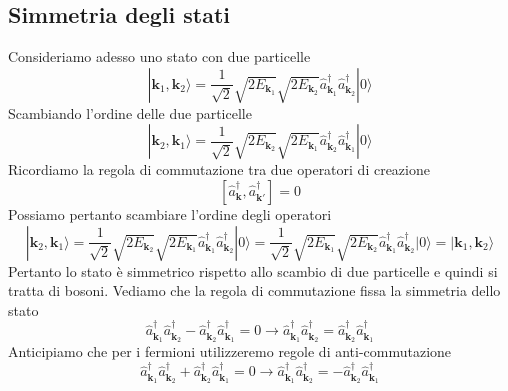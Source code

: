 \subsection{Simmetria degli stati}
Consideriamo adesso uno stato con due particelle
$$
|\mathbf{k}_1, \mathbf{k}_2\rangle = \frac{1}{\sqrt{2}} \sqrt{2E_{\mathbf{k}_1}} \sqrt{2E_{\mathbf{k}_2}} \hat{a}_{\mathbf{k}_1}^\dagger \hat{a}_{\mathbf{k}_2}^\dagger |0\rangle
$$
Scambiando l'ordine delle due particelle
$$
|\mathbf{k}_2,\mathbf{k}_1\rangle = \frac{1}{\sqrt{2}} \sqrt{2E_{\mathbf{k}_2}} \sqrt{2E_{\mathbf{k}_1}} \hat{a}_{\mathbf{k}_2}^\dagger \hat{a}_{\mathbf{k}_1}^\dagger |0\rangle
$$
Ricordiamo la regola di commutazione tra due operatori di creazione
$$
[\hat{a}_\mathbf{k}^\dagger, \hat{a}_{\mathbf{k}'}^\dagger] = 0
$$
Possiamo pertanto scambiare l'ordine degli operatori
$$
|\mathbf{k}_2,\mathbf{k}_1\rangle = \frac{1}{\sqrt{2}} \sqrt{2E_{\mathbf{k}_2}}\sqrt{2E_{\mathbf{k}_1}} \hat{a}_{\mathbf{k}_1}^\dagger \hat{a}_{\mathbf{k}_2}^\dagger |0\rangle = \frac{1}{\sqrt{2}} \sqrt{2E_{\mathbf{k}_1}}\sqrt{2E_{\mathbf{k}_2}} \hat{a}_{\mathbf{k}_1}^\dagger \hat{a}_{\mathbf{k}_2}^\dagger |0\rangle = |\mathbf{k}_1, \mathbf{k}_2\rangle
$$
Pertanto lo stato è simmetrico rispetto allo scambio di due particelle e quindi si tratta di bosoni. Vediamo che la regola di commutazione fissa la simmetria dello stato
$$
\hat{a}_{\mathbf{k}_1}^\dagger \hat{a}_{\mathbf{k}_2}^\dagger - \hat{a}_{\mathbf{k}_2}^\dagger \hat{a}_{\mathbf{k}_1}^\dagger = 0 \to \hat{a}_{\mathbf{k}_1}^\dagger \hat{a}_{\mathbf{k}_2}^\dagger = \hat{a}_{\mathbf{k}_2}^\dagger \hat{a}_{\mathbf{k}_1}^\dagger
$$
Anticipiamo che per i fermioni utilizzeremo regole di anti-commutazione
$$
\hat{a}_{\mathbf{k}_1}^\dagger \hat{a}_{\mathbf{k}_2}^\dagger + \hat{a}_{\mathbf{k}_2}^\dagger \hat{a}_{\mathbf{k}_1}^\dagger = 0 \to \hat{a}_{\mathbf{k}_1}^\dagger \hat{a}_{\mathbf{k}_2}^\dagger = -\hat{a}_{\mathbf{k}_2}^\dagger \hat{a}_{\mathbf{k}_1}^\dagger
$$
